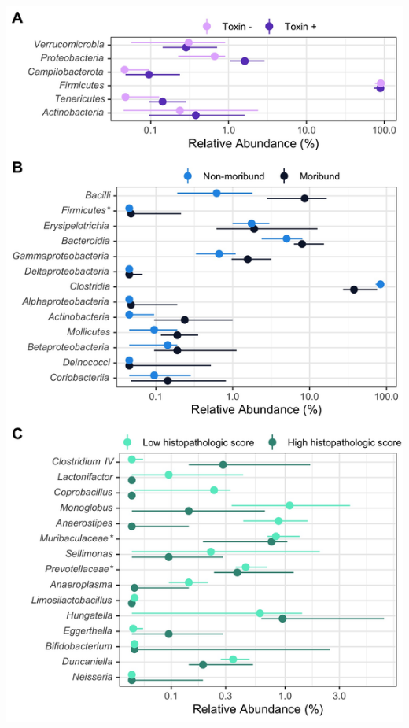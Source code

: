 \documentclass[
  12pt,
]{article}
\begin{document}
\includegraphics{../results/figures/figure_5.jpg}
\end{document}
